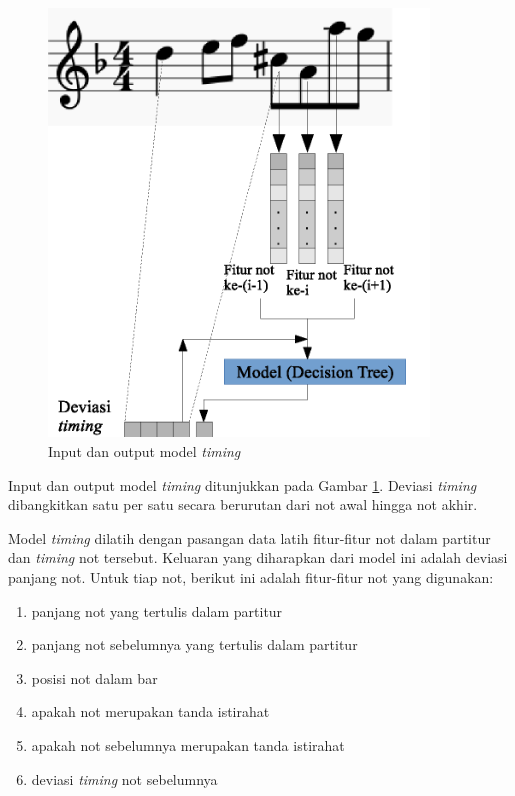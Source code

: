 \begin{figure}[htbp]
    \centering
    \includegraphics[width=0.9\textwidth]{resources/timing-model-in-out.eps}
    \caption{Input dan output model \textit{timing}}\label{fig-timing-model-in-out}
\end{figure}

Input dan output model \textit{timing} ditunjukkan pada Gambar \ref{fig-timing-model-in-out}. Deviasi \textit{timing} dibangkitkan satu per satu secara berurutan dari not awal hingga not akhir.

Model \textit{timing} dilatih dengan pasangan data latih fitur-fitur not dalam partitur dan \textit{timing} not tersebut. Keluaran yang diharapkan dari model ini adalah deviasi panjang not. Untuk tiap not, berikut ini adalah fitur-fitur not yang digunakan:

\begin{enumerate}
    \item panjang not yang tertulis dalam partitur
    \item panjang not sebelumnya yang tertulis dalam partitur
    \item posisi not dalam bar
    \item apakah not merupakan tanda istirahat
    \item apakah not sebelumnya merupakan tanda istirahat
    \item deviasi \textit{timing} not sebelumnya
\end{enumerate}

